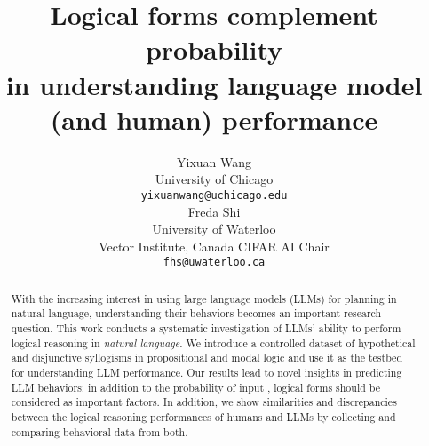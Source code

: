 \documentclass[11pt]{article}
\title{
    Logical forms complement probability \\
    in understanding language model (and human) performance
}
\author{Yixuan Wang \\
  University of Chicago \\
  \texttt{yixuanwang@uchicago.edu} \\\And
  Freda Shi \\
  University of Waterloo \\
  Vector Institute, Canada CIFAR AI Chair \\
  \texttt{fhs@uwaterloo.ca} \\}
\begin{document}
\setlength{\Exlabelsep}{0em}
\setlength{\SubExleftmargin}{1em}

\maketitle
\begin{abstract}
  With the increasing interest in using large language models (LLMs) for planning in natural language, understanding their behaviors becomes an important research question.
  This work conducts a systematic investigation of LLMs' ability to perform logical reasoning in \textit{natural language}.
  We introduce a controlled dataset of hypothetical and disjunctive syllogisms in propositional and modal logic and use it as the testbed for understanding LLM performance.
  Our results lead to novel insights in predicting LLM behaviors: in addition to the probability of input \citep{gonen-etal-2023-demystifying,mccoyEmbersAutoregressionShow2024}, logical forms should be considered as important factors.
  In addition, we show similarities and discrepancies between the logical reasoning performances of humans and LLMs by collecting and comparing behavioral data from both.
\end{abstract}











\appendix




\end{document}
